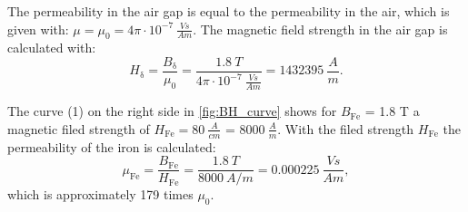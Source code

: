 \begin{solutionblock}
    The permeability in the air gap is equal to the permeability in the air, which is given with: \newline $\mu = \mu_{\mathrm{0}} = 4 \pi \cdot 10^{-7} \ \frac{\si{Vs}}{\si{Am}}$. The magnetic field strength in the air gap is calculated with:
    \begin{equation}
        H_{\mathrm{\updelta}} = \frac{B_{\mathrm{\updelta}}}{\mu_{\mathrm{0}}}
        = \frac{1.8 \ \si{T}}{4 \pi \cdot 10^{-7} \ \frac{\si{Vs}}{\si{Am}}}
        = 1432395 \ \frac{\si{A}}{\si{m}}.
    \end{equation}

    The curve (1) on the right side in \autoref{fig:BH_curve} shows for $B_{\mathrm{Fe}}$ = 1.8 \si{T} a magnetic filed strength of \newline $H_{\mathrm{Fe}} = 80 \ \frac{\si{A}}{\si{cm}}$ = $8000 \ \frac{\si{A}}{\si{m}}$. With the filed strength $H_{\mathrm{Fe}}$ the permeability of the iron is calculated:
    \begin{equation}
        \mu_{\mathrm{Fe}} = \frac{B_{\mathrm{Fe}}}{H_{\mathrm{Fe}}}
        = \frac{1.8 \ \si{T}}{8000 \ \si{A/m}}
        = 0.000225 \ \frac{\si{Vs}}{\si{Am}},
    \end{equation}
    which is approximately 179 times $\mu_{\mathrm{0}}$.

\end{solutionblock}




